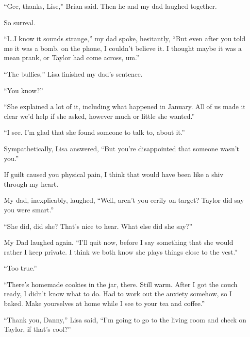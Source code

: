 ``Gee, thanks, Lise,'' Brian said.  Then he and my dad laughed together.



So surreal.



``I\ldots I know it sounds strange,'' my dad spoke, hesitantly, ``But even after you told me it was a bomb, on the phone, I couldn't believe it.  I thought maybe it was a mean prank, or Taylor had come across, um.''



``The bullies,'' Lisa finished my dad's sentence.



``You know?''



``She explained a lot of it, including what happened in January.  All of us made it clear we'd help if she asked, however much or little she wanted.''



``I see.  I'm glad that she found someone to talk to, about it.''



Sympathetically, Lisa answered, ``But you're disappointed that someone wasn't you.''



If guilt caused you physical pain, I think that would have been like a shiv through my heart.



My dad, inexplicably, laughed, ``Well, aren't you eerily on target?  Taylor did say you were smart.''



``She did, did she?  That's nice to hear.  What else did she say?''



My Dad laughed again. ``I'll quit now, before I say something that she would rather I keep private.  I think we both know she plays things close to the vest.''



``Too true.''



``There's homemade cookies in the jar, there.  Still warm.  After I got the couch ready, I didn't know what to do.  Had to work out the anxiety somehow, so I baked.  Make yourselves at home while I see to your tea and coffee.''



``Thank you, Danny,'' Lisa said, ``I'm going to go to the living room and check on Taylor, if that's cool?''



